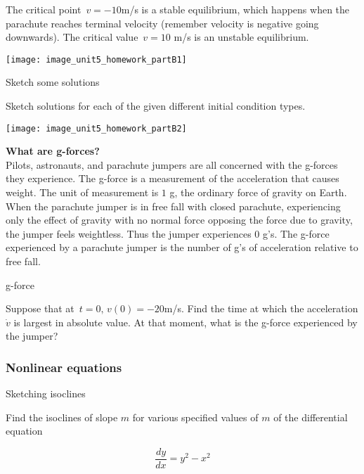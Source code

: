 The critical point $\, v = −10$m/s is a stable equilibrium,
which happens when the parachute reaches terminal velocity
(remember velocity is negative going downwards).
The critical value $\,v = 10$ m/s is an unstable equilibrium.

\texttt{[image: image\_unit5\_homework\_partB1]}

\clearpage

\begin{problem}
  Sketch some solutions
\end{problem}

Sketch solutions for each of the given different initial condition types.

\texttt{[image: image\_unit5\_homework\_partB2]}


\textbf{What are g-forces?} \\
Pilots, astronauts, and parachute jumpers are all concerned with the g-forces
they experience. The g-force is a measurement of the acceleration that causes weight.
The unit of measurement is $1$ g, the ordinary force of gravity on Earth.
When the parachute jumper is in free fall with closed parachute,
experiencing only the effect of gravity with no normal force opposing
the force due to gravity, the jumper feels weightless.
Thus the jumper experiences $0$ g's.
The g-force experienced by a parachute jumper is the number of g's of acceleration relative to free fall.

\begin{problem}
  g-force
\end{problem}

Suppose that at $\, t = 0,\, v(0)= - 20$m/s.
Find the time at which the acceleration $\dot v$ is largest in absolute value.
At that moment, what is the g-force experienced by the jumper?

\clearpage

\subsubsection{Nonlinear equations}

\begin{problem}
  Sketching isoclines
\end{problem}

Find the isoclines of slope $m$ for various specified values of $m$ of the differential equation

\begin{equation*}
  \frac{dy}{dx} = y^2 - x^2
\end{equation*}

